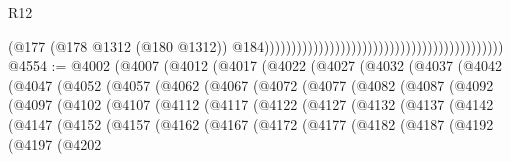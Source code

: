 \begin{lexlean}{R12}
\begin{coremodule}
{{{{{{{{{{{{{{{{{{{{{{{{{{{{{{{{{{{{{{{{{{{{{{{{{{{{{{{{{{{{{{{{{{{{{{{{{{{{{{{{{{                                                                                          (@177
                                                                                            (@178
                                                                                              @1312
                                                                                              (@180
                                                                                                @1312))
                                                                                            @184))))))))))))))))))))))))))))))))))))))))))))
@4554 := @4002
    (@4007
      (@4012
        (@4017
          (@4022
            (@4027
              (@4032
                (@4037
                  (@4042
                    (@4047
                      (@4052
                        (@4057
                          (@4062
                            (@4067
                              (@4072
                                (@4077
                                  (@4082
                                    (@4087
                                      (@4092
                                        (@4097
                                          (@4102
                                            (@4107
                                              (@4112
                                                (@4117
                                                  (@4122
                                                    (@4127
                                                      (@4132
                                                        (@4137
                                                          (@4142
                                                            (@4147
                                                              (@4152
                                                                (@4157
                                                                  (@4162
                                                                    (@4167
                                                                      (@4172
                                                                        (@4177
                                                                          (@4182
                                                                            (@4187
                                                                              (@4192
                                                                                (@4197
                                                                                  (@4202
}}}}}}}}}}}}}}}}}}}}}}}}}}}}}}}}}}}}}}}}}}}}}}}}}}}}}}}}}}}}}}}}}}}}}}}}}}}}}}}}}}
\end{coremodule}
\end{lexlean}

